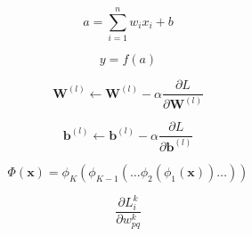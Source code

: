 \documentclass{article}
\begin{document}
\begin{tcolorbox}[colback=pastelblue, colframe=pastelblue]
\begin{equation}
    a = \sum_{i=1}^{n} w_i x_i + b
\end{equation}
\end{tcolorbox}

\begin{tcolorbox}[colback=pastelpurple, colframe=pastelpurple]
\begin{equation}
    y = f(a)
\end{equation}
\end{tcolorbox}

\begin{equation}
\mathbf{W}^{(l)} \leftarrow \mathbf{W}^{(l)} - \alpha \frac{\partial L}{\partial \mathbf{W}^{(l)}}
\end{equation}

\begin{equation}
\mathbf{b}^{(l)} \leftarrow \mathbf{b}^{(l)} - \alpha \frac{\partial L}{\partial \mathbf{b}^{(l)}}
\end{equation}

\begin{equation}
\Phi(\boldsymbol{x})=\phi_K(\phi_{K-1}(\dots \phi_2(\phi_1(\boldsymbol{x}))\dots))
\end{equation}



\begin{equation}
\frac{\partial L_i^{k}}{\partial w_{pq}^{k}}
\end{equation}
\end{document}
